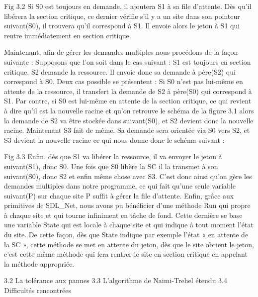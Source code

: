 \documentclass[a4paper,french,towsides,10pt]{book}
\begin{document}
Fig 3.2
Si S0 est toujours en demande, il ajoutera S1 à sa file d’attente. Dès qu’il libérera la section critique, ce dernier vérifie s’il y a un site dans son pointeur suivant(S0), il trouvera qu’il correspond à S1. Il envoie alors le jeton à S1 qui rentre immédiatement en section critique.



Maintenant, afin de gérer les demandes multiples nous procédons de la façon suivante :
Supposons que l’on soit dans le cas suivant :
S1 est toujours en section critique, S2 demande la ressource. Il envoie donc sa demande à père(S2) qui correspond à S0.
Deux cas possible se présentent :
Si S0 n’est pas lui-même en attente de la ressource, il transfert la demande de S2 à père(S0) qui correspond à S1.
Par contre, si S0 est lui-même en attente de la section critique, ce qui revient à dire qu’il est la nouvelle racine et qu’on retrouve le schéma de la figure 3.1 alors la demande de S2 va être stockée dans suivant(S0), et S2 devient donc la nouvelle racine. Maintenant S3 fait de même. Sa demande sera orientée via S0 vers S2, et S3 devient la nouvelle racine ce qui nous donne donc le schéma suivant :

Fig 3.3
Enfin, dès que S1 va libérer la ressource, il va envoyer le jeton à suivant(S1), donc S0. Une fois que S0 libère la SC il la transmet à son suivant(S0), donc S2 et enfin même chose avec S3.
C’est donc ainsi qu’on gère les demandes multiples dans notre programme, ce qui fait qu’une seule variable suivant(P) sur chaque site P suffit à gérer la file d’attente.
Enfin, grâce aux primitives de SDL\_Net, nous avons pu bénéficier d’une méthode Run qui propre à chaque site et qui tourne infiniment en tâche de fond. Cette dernière se base une variable State qui est locale à chaque site et qui indique à tout moment l’état du site. De cette façon, dès que State indique par exemple l’état « en attente de la SC », cette méthode se met en attente du jeton, dès que le site obtient le jeton, c’est cette même méthode qui fera rentrer le site en section critique en appelant la méthode appropriée.


3.2 La tolérance aux pannes
3.3 L’algorithme de Naimi-Trehel étendu
3.4 Difficultés rencontrées
\end{document}
